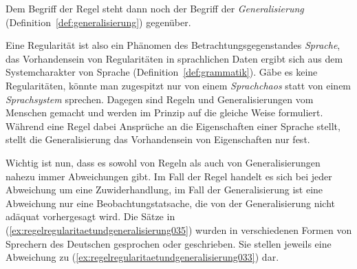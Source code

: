 
Dem Begriff der Regel steht dann noch der Begriff der \textit{Generalisierung} (Definition~\ref{def:generalisierung}) gegenüber.


Eine Regularität ist also ein Phänomen des Betrachtungsgegenstandes \textit{Sprache}, das Vorhandensein von Regularitäten in sprachlichen Daten ergibt sich aus dem Systemcharakter von Sprache (Definition~\ref{def:grammatik}).
Gäbe es keine Regularitäten, könnte man zugespitzt nur von einem \textit{Sprachchaos} statt von einem \textit{Sprachsystem} sprechen.
Dagegen sind Regeln und Generalisierungen vom Menschen gemacht und werden im Prinzip auf die gleiche Weise formuliert.
Während eine Regel dabei Ansprüche an die Eigenschaften einer Sprache stellt, stellt die Generalisierung das Vorhandensein von Eigenschaften nur fest.

Wichtig ist nun, dass es sowohl von Regeln als auch von Generalisierungen nahezu immer Abweichungen gibt.
Im Fall der Regel handelt es sich bei jeder Abweichung um eine Zuwiderhandlung, im Fall der Generalisierung ist eine Abweichung nur eine Beobachtungstatsache, die von der Generalisierung nicht adäquat vorhergesagt wird.
Die Sätze in (\ref{ex:regelregularitaetundgeneralisierung035}) wurden in verschiedenen Formen von Sprechern des Deutschen gesprochen oder geschrieben.
Sie stellen jeweils eine Abweichung zu (\ref{ex:regelregularitaetundgeneralisierung033}) dar.

\begin{exe}
  \ex\label{ex:regelregularitaetundgeneralisierung035}
  \begin{xlist}
  \end{xlist}
\end{exe}

